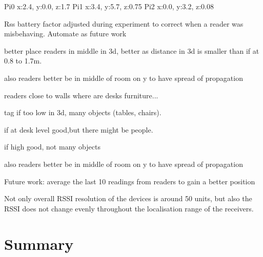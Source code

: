 Pi0 x:2.4, y:0.0, z:1.7
Pi1 x:3.4, y:5.7, z:0.75
Pi2 x:0.0, y:3.2, z:0.08


Rss battery factor adjusted during experiment to correct when a reader was misbehaving. Automate as future work

better place readers in middle in 3d, better as distance in 3d is smaller than if at 0.8 to 1.7m.

also readers better be in middle of room on y to have spread of propagation \/

readers close to walls where are desks furniture... 

tag if too low in 3d, many objects (tables, chairs).

if at desk level good,but there might be people.

if high good, not many objects

also readers better be in middle of room on y to have spread of propagation \/

Future work: average the last 10 readings from readers to gain a better position

Not only overall RSSI resolution of the devices is around 50 units, but also the RSSI does not change evenly throughout the localisation range of the receivers. 

\section{Summary}

